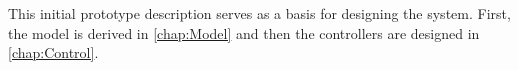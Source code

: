 



This initial prototype description serves as a basis for designing the system. First, the model is derived in \autoref{chap:Model} and then the controllers are designed in \autoref{chap:Control}.

